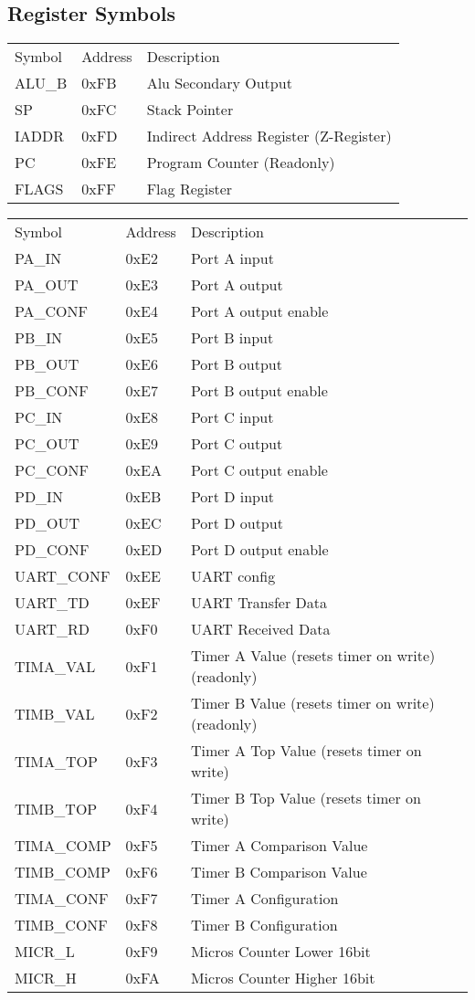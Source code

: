 \begin{footnotesize}
\section{Register Symbols} \label{section:register-symbols}
\begin{tabular}{|p{20mm}|p{15mm}|p{80mm}|}
    \rowcolor{gray!50}
    \hline
    Symbol & Address & Description \\
    ALU\_B & 0xFB & Alu Secondary Output \\
    SP & 0xFC & Stack Pointer \\
    IADDR & 0xFD & Indirect Address Register (Z-Register)\\
    PC & 0xFE & Program Counter (Readonly) \\
    FLAGS & 0xFF & Flag Register \\ \hline
\end{tabular}
\newpage
\begin{tabular}{|p{20mm}|p{15mm}|p{80mm}|}
    \rowcolor{gray!50}
    \hline
    Symbol & Address & Description \\
    PA\_IN & 0xE2 & Port A input \\
    PA\_OUT & 0xE3 & Port A output \\
    PA\_CONF & 0xE4 & Port A output enable\\
    PB\_IN & 0xE5 & Port B input \\
    PB\_OUT & 0xE6 & Port B output \\
    PB\_CONF & 0xE7 & Port B output enable\\
    PC\_IN & 0xE8 & Port C input \\
    PC\_OUT & 0xE9 & Port C output \\
    PC\_CONF & 0xEA & Port C output enable\\
    PD\_IN & 0xEB & Port D input \\
    PD\_OUT & 0xEC & Port D output \\
    PD\_CONF & 0xED & Port D output enable\\
    UART\_CONF & 0xEE & UART config \\
    UART\_TD & 0xEF & UART Transfer Data \\
    UART\_RD & 0xF0 & UART Received Data \\
    TIMA\_VAL & 0xF1 & Timer A Value (resets timer on write) (readonly) \\
    TIMB\_VAL & 0xF2 & Timer B Value (resets timer on write) (readonly) \\
    TIMA\_TOP & 0xF3 & Timer A Top Value (resets timer on write) \\
    TIMB\_TOP & 0xF4 & Timer B Top Value (resets timer on write) \\
    TIMA\_COMP & 0xF5 & Timer A Comparison Value \\
    TIMB\_COMP & 0xF6 & Timer B Comparison Value \\
    TIMA\_CONF & 0xF7 & Timer A Configuration \\
    TIMB\_CONF & 0xF8 & Timer B Configuration \\
    MICR\_L & 0xF9 & Micros Counter Lower 16bit \\
    MICR\_H & 0xFA & Micros Counter Higher 16bit \\


\end{tabular}
\end{footnotesize}
